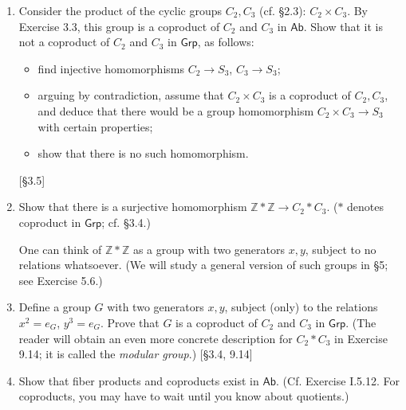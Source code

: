 \begin{enumerate}
    \item Consider the product of the cyclic groups $C_2, C_3$ (cf. \S2.3): $C_2 \times C_3$. By Exercise 3.3, this group is a coproduct of $C_2$ and $C_3$ in $\mathsf{Ab}$. Show that it is not a coproduct of $C_2$ and $C_3$ in $\mathsf{Grp}$, as follows:
          \begin{itemize}
              \item find injective homomorphisms $C_2 \to S_3$, $C_3 \to S_3$;
              \item arguing by contradiction, assume that $C_2 \times C_3$ is a coproduct of $C_2, C_3$, and deduce that there would be a group homomorphism $C_2 \times C_3 \to S_3$ with certain properties;
              \item show that there is no such homomorphism.
          \end{itemize}
          [\S3.5]

    \item Show that there is a surjective homomorphism $\mathbb{Z} \ast \mathbb{Z} \to C_2 \ast C_3$. ($\ast$ denotes coproduct in $\mathsf{Grp}$; cf. \S3.4.)

          One can think of $\mathbb{Z} \ast \mathbb{Z}$ as a group with two generators $x, y$, subject to no relations whatsoever. (We will study a general version of such groups in \S5; see Exercise 5.6.)

    \item Define a group $G$ with two generators $x, y$, subject (only) to the relations $x^2 = e_G$, $y^3 = e_G$. Prove that $G$ is a coproduct of $C_2$ and $C_3$ in $\mathsf{Grp}$. (The reader will obtain an even more concrete description for $C_2 \ast C_3$ in Exercise 9.14; it is called the \textit{modular group}.) [\S3.4, 9.14]

    \item Show that fiber products and coproducts exist in $\mathsf{Ab}$. (Cf. Exercise I.5.12. For coproducts, you may have to wait until you know about quotients.)
\end{enumerate}